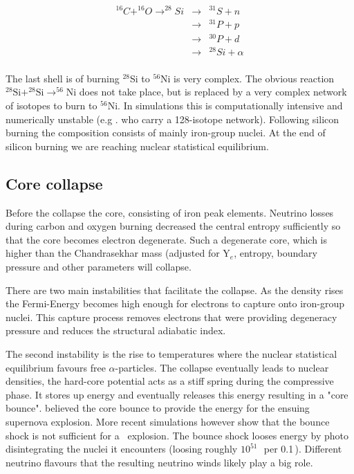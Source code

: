 \begin{eqnarray}
^{16}C+^{16}O\rightarrow^{28}Si&\rightarrow&^{31}S+n \nonumber \\
	&\rightarrow&^{31}P + p \nonumber \\
	&\rightarrow&^{30}P + d \nonumber \\
	&\rightarrow&^{28}Si + \alpha \nonumber \\
	\label{eqn:c_burning}
\end{eqnarray}

The last shell is of burning $^{28}$Si to $^{56}$Ni is very complex. The obvious reaction $^{28}\textrm{Si}+^{28}\textrm{Si}\rightarrow^{56}\textrm{Ni}$ does not take place, but is replaced by a very complex network of isotopes to burn to $^{56}\textrm{Ni}$. In simulations this is computationally intensive and numerically unstable (e.g .  \citet{1978ApJ...225.1021W} who carry a 128-isotope network). 
Following silicon burning the composition consists of mainly iron-group nuclei. 
At the end of silicon burning we are reaching nuclear statistical equilibrium. 

\subsection{Core collapse} Before the collapse the core, consisting of iron peak elements. Neutrino losses during carbon and oxygen burning decreased the central entropy sufficiently so that the core becomes electron degenerate. Such a degenerate core, which is higher than the Chandrasekhar mass (adjusted for Y$_e$, entropy, boundary pressure and other parameters will collapse. 

There are two main instabilities that facilitate the collapse. As the density rises the Fermi-Energy becomes high enough for electrons to capture onto iron-group nuclei. This capture process removes electrons that were providing degeneracy pressure and reduces the structural adiabatic index. 

The second instability is the rise to temperatures where the nuclear statistical equilibrium favours free $\alpha$-particles. The collapse eventually leads to nuclear densities, the hard-core potential acts as a stiff spring during the compressive phase. It stores up energy and eventually releases this energy resulting in a "core bounce".  
\citet{1985PhRvL..55..126B,1987PhRvL..59..736B} believed the core bounce to provide the energy for the ensuing supernova explosion. More recent simulations however show that the bounce shock is not sufficient for a \snii\ explosion. The bounce shock looses energy by photo disintegrating the nuclei it encounters (loosing roughly $10^{51}$\,\erg\ per 0.1\,\msun). Different neutrino flavours  that the resulting neutrino winds likely play a big role. 

